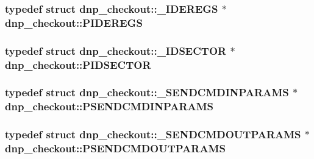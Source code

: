 \hypertarget{namespacednp__checkout_a0b2672b75481f48c72696764070792cd}{
\subsubsection[{P\-I\-D\-E\-R\-E\-G\-S}]{\setlength{\rightskip}{0pt plus 5cm}typedef struct {\bf dnp\-\_\-checkout\-::\-\_\-\-I\-D\-E\-R\-E\-G\-S} $\ast$ {\bf dnp\-\_\-checkout\-::\-P\-I\-D\-E\-R\-E\-G\-S}}}\label{namespacednp__checkout_a0b2672b75481f48c72696764070792cd}
\hypertarget{namespacednp__checkout_a6285f85f01ec201545b921c24a977b6e}{
\subsubsection[{P\-I\-D\-S\-E\-C\-T\-O\-R}]{\setlength{\rightskip}{0pt plus 5cm}typedef struct {\bf dnp\-\_\-checkout\-::\-\_\-\-I\-D\-S\-E\-C\-T\-O\-R} $\ast$ {\bf dnp\-\_\-checkout\-::\-P\-I\-D\-S\-E\-C\-T\-O\-R}}}\label{namespacednp__checkout_a6285f85f01ec201545b921c24a977b6e}
\hypertarget{namespacednp__checkout_a9a258707ab31e1440dc4dda9384d454e}{
\subsubsection[{P\-S\-E\-N\-D\-C\-M\-D\-I\-N\-P\-A\-R\-A\-M\-S}]{\setlength{\rightskip}{0pt plus 5cm}typedef struct {\bf dnp\-\_\-checkout\-::\-\_\-\-S\-E\-N\-D\-C\-M\-D\-I\-N\-P\-A\-R\-A\-M\-S} $\ast$ {\bf dnp\-\_\-checkout\-::\-P\-S\-E\-N\-D\-C\-M\-D\-I\-N\-P\-A\-R\-A\-M\-S}}}\label{namespacednp__checkout_a9a258707ab31e1440dc4dda9384d454e}
\hypertarget{namespacednp__checkout_acea691d4d3e0a27a9a60cf36e2767942}{
\subsubsection[{P\-S\-E\-N\-D\-C\-M\-D\-O\-U\-T\-P\-A\-R\-A\-M\-S}]{\setlength{\rightskip}{0pt plus 5cm}typedef struct {\bf dnp\-\_\-checkout\-::\-\_\-\-S\-E\-N\-D\-C\-M\-D\-O\-U\-T\-P\-A\-R\-A\-M\-S} $\ast$ {\bf dnp\-\_\-checkout\-::\-P\-S\-E\-N\-D\-C\-M\-D\-O\-U\-T\-P\-A\-R\-A\-M\-S}}}\label{namespacednp__checkout_acea691d4d3e0a27a9a60cf36e2767942}
